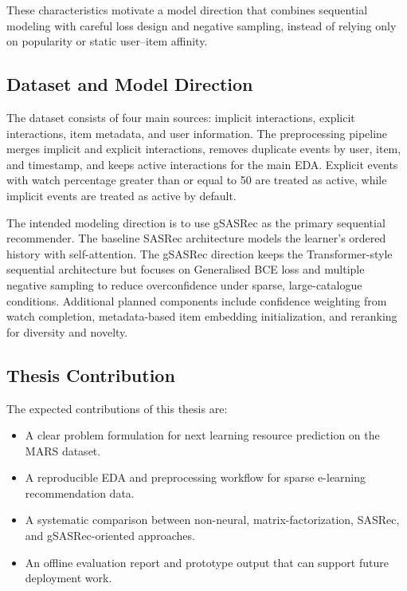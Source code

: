 These characteristics motivate a model direction that combines sequential modeling with careful loss design and negative sampling, instead of relying only on popularity or static user--item affinity.

\subsection{Dataset and Model Direction}

The dataset consists of four main sources: implicit interactions, explicit interactions, item metadata, and user information. The preprocessing pipeline merges implicit and explicit interactions, removes duplicate events by user, item, and timestamp, and keeps active interactions for the main EDA. Explicit events with watch percentage greater than or equal to 50 are treated as active, while implicit events are treated as active by default.

The intended modeling direction is to use gSASRec as the primary sequential recommender. The baseline SASRec architecture models the learner's ordered history with self-attention. The gSASRec direction keeps the Transformer-style sequential architecture but focuses on Generalised BCE loss and multiple negative sampling to reduce overconfidence under sparse, large-catalogue conditions. Additional planned components include confidence weighting from watch completion, metadata-based item embedding initialization, and reranking for diversity and novelty.

\subsection{Thesis Contribution}

The expected contributions of this thesis are:

\begin{itemize}
    \item A clear problem formulation for next learning resource prediction on the MARS dataset.
    \item A reproducible EDA and preprocessing workflow for sparse e-learning recommendation data.
    \item A systematic comparison between non-neural, matrix-factorization, SASRec, and gSASRec-oriented approaches.
    \item An offline evaluation report and prototype output that can support future deployment work.
\end{itemize}

